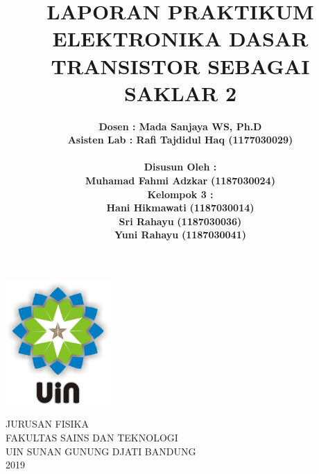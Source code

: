 \documentclass[12pt,a4paper]{article}
\begin{document}
\onehalfspacing
\begin{titlepage}

\title{\textbf{LAPORAN PRAKTIKUM ELEKTRONIKA DASAR
\\ TRANSISTOR SEBAGAI SAKLAR 2}}  %
\author{\textbf {Dosen : Mada Sanjaya WS, Ph.D  }
\\ \textbf{Asisten Lab : Rafi Tajdidul Haq (1177030029)}
\\ \textbf{ }
\\ \textbf{Disusun Oleh :}
\\ \textbf{Muhamad Fahmi Adzkar} \textbf {(1187030024)}
\\ \textbf{Kelompok 3 :}
\\ \textbf{Hani Hikmawati} \textbf {(1187030014)}
\\ \textbf{Sri Rahayu} \textbf {(1187030036)}
\\ \textbf{Yuni Rahayu} \textbf {(1187030041)}}

\maketitle
\begin{center}
\vspace{1cm}
\includegraphics[width=4cm]{uin.png}
\vspace{1cm}

JURUSAN FISIKA\\
FAKULTAS SAINS DAN TEKNOLOGI\\
UIN SUNAN GUNUNG DJATI BANDUNG\\
2019\\
\end{center}
\end{titlepage}
\end{document}
